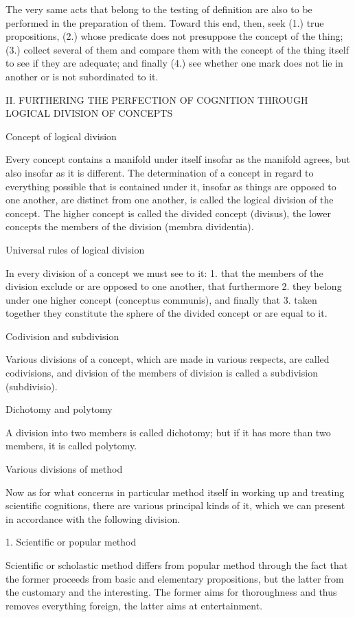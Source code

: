The very same acts that belong to the testing of definition are
also to be performed in the preparation of them.
Toward this end, then, seek
(1.)    true propositions,
(2.)    whose predicate does not presuppose the concept of the thing;
(3.)    collect several of them and compare them with
        the concept of the thing itself
        to see if they are adequate; and finally
(4.)    see whether one mark does not lie in another
        or is not subordinated to it.

II. FURTHERING THE PERFECTION OF COGNITION
THROUGH LOGICAL DIVISION OF CONCEPTS

Concept of logical division

Every concept contains a manifold under itself
insofar as the manifold agrees,
but also insofar as it is different.
The determination of a concept in regard to
everything possible that is contained under it,
insofar as things are opposed to one another,
are distinct from one another,
is called the logical division of the concept.
The higher concept is called the divided concept (divisus),
the lower concepts the members of the division (membra dividentia).

Universal rules of logical division

In every division of a concept we must see to it:
1.  that the members of the division exclude
    or are opposed to one another,
    that furthermore
2.  they belong under one higher concept (conceptus communis),
    and finally that
3.  taken together they constitute
    the sphere of the divided concept
    or are equal to it.

Codivision and subdivision

Various divisions of a concept,
which are made in various respects,
are called codivisions,
and division of the members of division
is called a subdivision (subdivisio).

Dichotomy and polytomy

A division into two members is called dichotomy;
but if it has more than two members, it is called polytomy.

Various divisions of method

Now as for what concerns in particular method itself
in working up and treating scientific cognitions,
there are various principal kinds of it,
which we can present in accordance with the following division.

1. Scientific or popular method

Scientific or scholastic method differs from popular method
through the fact that the former proceeds from
basic and elementary propositions,
but the latter from the customary and the interesting.
The former aims for thoroughness and thus removes everything foreign,
the latter aims at entertainment.

